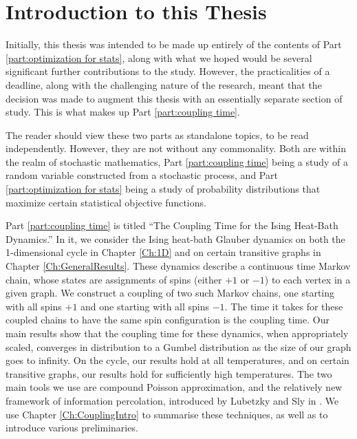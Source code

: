 \chapter{Introduction to this Thesis}
\label{Ch:ThesisIntro}


Initially, this thesis was intended to be made up entirely of the contents of Part \ref{part:optimization for stats}, along with what we hoped would be several significant further contributions to the study. However, the practicalities of a deadline, along with the challenging nature of the research, meant that the decision was made to augment this thesis with an essentially separate section of study. This is what makes up Part \ref{part:coupling time}.

The reader should view these two parts as standalone topics, to be read independently. However, they are not without any commonality. Both are within the realm of stochastic mathematics, Part \ref{part:coupling time} being a study of a random variable constructed from a stochastic process, and Part \ref{part:optimization for stats} being a study of probability distributions that maximize certain statistical objective functions. 


Part \ref{part:coupling time} is titled ``The Coupling Time for the Ising Heat-Bath Dynamics.'' In it, we consider the Ising heat-bath Glauber dynamics on both the 1-dimensional cycle in Chapter \ref{Ch:1D} and on certain transitive graphs in Chapter \ref{Ch:GeneralResults}. These dynamics describe a continuous time Markov chain, whose states are assignments of spins (either $+1$ or $-1$) to each vertex in a given graph. We construct a coupling of two such Markov chains, one starting with all spins $+1$ and one starting with all spins $-1$. The time it takes for these coupled chains to have the same spin configuration is the coupling time.
Our main results show that the coupling time for these dynamics, when appropriately scaled, converges in distribution to a Gumbel distribution as the size of our graph goes to infinity. On the cycle, our results hold at all temperatures, and on certain transitive graphs, our results hold for sufficiently high temperatures. The two main tools we use are compound Poisson approximation, and the relatively new framework of information percolation, introduced by Lubetzky and Sly in \cite{Lubetzky2016-wd}. We use Chapter \ref{Ch:CouplingIntro} to summarise these techniques, as well as to introduce various preliminaries.

